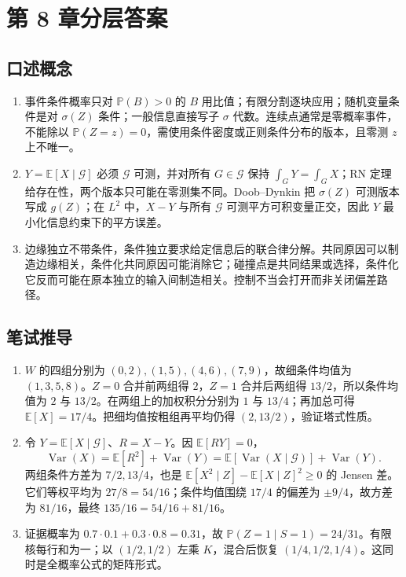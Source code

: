 \chapter{第 8 章分层答案}
\label{app:ch08-solutions}

\section*{口述概念}
\begin{enumerate}[leftmargin=*]
  \item 事件条件概率只对 $\mathbb P(B)>0$ 的 $B$ 用比值；有限分割逐块应用；随机变量条件是对 $\sigma(Z)$ 条件；一般信息直接写子 $\sigma$ 代数。连续点通常是零概率事件，不能除以 $\mathbb P(Z=z)=0$，需使用条件密度或正则条件分布的版本，且零测 $z$ 上不唯一。
  \item $Y=\mathbb E[X\mid\mathcal G]$ 必须 $\mathcal G$ 可测，并对所有 $G\in\mathcal G$ 保持 $\int_GY=\int_GX$；RN 定理给存在性，两个版本只可能在零测集不同。Doob--Dynkin 把 $\sigma(Z)$ 可测版本写成 $g(Z)$；在 $L^2$ 中，$X-Y$ 与所有 $\mathcal G$ 可测平方可积变量正交，因此 $Y$ 最小化信息约束下的平方误差。
  \item 边缘独立不带条件，条件独立要求给定信息后的联合律分解。共同原因可以制造边缘相关，条件化共同原因可能消除它；碰撞点是共同结果或选择，条件化它反而可能在原本独立的输入间制造相关。控制不当会打开而非关闭偏差路径。
\end{enumerate}

\section*{笔试推导}
\begin{enumerate}[leftmargin=*]
  \item $W$ 的四组分别为 $(0,2),(1,5),(4,6),(7,9)$，故细条件均值为 $(1,3,5,8)$。$Z=0$ 合并前两组得 $2$，$Z=1$ 合并后两组得 $13/2$，所以条件均值为 $2$ 与 $13/2$。在两组上的加权积分分别为 $1$ 与 $13/4$；再加总可得 $\mathbb E[X]=17/4$。把细均值按粗组再平均仍得 $(2,13/2)$，验证塔式性质。
  \item 令 $Y=\mathbb E[X\mid\mathcal G]$、$R=X-Y$。因 $\mathbb E[RY]=0$，
  \[
   \operatorname{Var}(X)=\mathbb E[R^2]+\operatorname{Var}(Y)
   =\mathbb E[\operatorname{Var}(X\mid\mathcal G)]
    +\operatorname{Var}(Y).
  \]
  两组条件方差为 $7/2,13/4$，也是 $\mathbb E[X^2\mid Z]-\mathbb E[X\mid Z]^2\ge0$ 的 Jensen 差。它们等权平均为 $27/8=54/16$；条件均值围绕 $17/4$ 的偏差为 $\pm9/4$，故方差为 $81/16$，最终 $135/16=54/16+81/16$。
  \item 证据概率为 $0.7\cdot0.1+0.3\cdot0.8=0.31$，故 $\mathbb P(Z=1\mid S=1)=24/31$。有限核每行和为一；以 $(1/2,1/2)$ 左乘
  $K$，混合后恢复 $(1/4,1/2,1/4)$。这同时是全概率公式的矩阵形式。
\end{enumerate}

